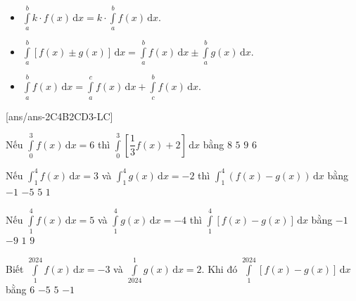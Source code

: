 \begin{itemize}
	\item $\displaystyle \int\limits_{a}^bk\cdot f(x)\mathrm{\, d}x=k\cdot \displaystyle \int\limits_{a}^bf(x)\mathrm{\, d}x$.
	\item $\displaystyle \int\limits_{a}^b\left[f(x)\pm g(x)\right]\mathrm{\, d}x=\displaystyle \int\limits_{a}^bf(x)\mathrm{\, d}x\pm \displaystyle \int\limits_{a}^bg(x)\mathrm{\, d}x$.
	\item $\displaystyle \int\limits_{a}^bf(x)\mathrm{\, d}x=\displaystyle \int\limits_{a}^cf(x)\mathrm{\, d}x+\displaystyle \int\limits_{c}^bf(x)\mathrm{\, d}x$.
\end{itemize}
\TN
{}[ans/ans-2C4B2CD3-LC]
\begin{ex}%
	Nếu $\displaystyle\int\limits_0^3f(x)\mathrm{\,d}x=6$ thì $\displaystyle\int\limits_0^3\left[\dfrac{1}{3}f(x)+2\right]\mathrm{\,d}x$ bằng
	\choice
	{\True $8$}
	{$5$}
	{$9$}
	{$6$}
\end{ex}
\begin{ex}%
	Nếu $\displaystyle\int_1^4 f(x) \mathrm{\,d}x=3$ và $\displaystyle\int_1^4 g(x) \mathrm{\,d}x=-2$ thì $\displaystyle\int_1^4\left(f(x)-g(x)\right)\mathrm{\,d}x$ bằng
	\choice
	{$-1$}
	{$-5$}
	{\True $5$}
	{$1$}
\end{ex}
\begin{ex}%
	Nếu $\displaystyle\int\limits_1^4f(x)\mathrm{\,d}x=5$ và $\displaystyle\int\limits_1^4g(x)\mathrm{\,d}x=-4$ thì $\displaystyle\int\limits_1^4\left[f(x)-g(x)\right]\mathrm{\,d}x$ bằng
	\choice
	{$-1$}
	{$-9$}
	{$1$}
	{\True $9$}
\end{ex}
\begin{ex}%
	Biết $\displaystyle\int\limits_1^{2024}f(x)\mathrm{\,d}x=-3$ và $\displaystyle\int\limits_{2024}^1g(x)\mathrm{\,d}x=2$. Khi đó $\displaystyle\int\limits_1^{2024}\left[f(x)-g(x)\right]\mathrm{\,d}x$ bằng
	\choice
	{$6$}
	{$-5$}
	{$5$}
	{\True $-1$}
\end{ex}
